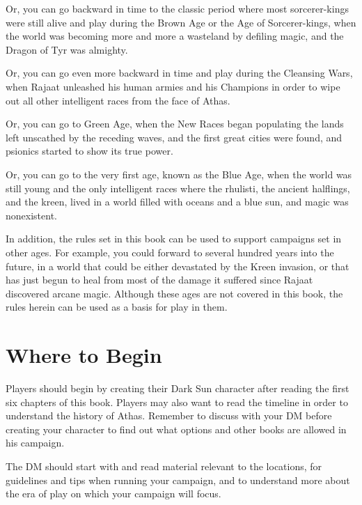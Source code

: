 Or, you can go backward in time to the classic period where most sorcerer-kings were still alive and play during the Brown Age or the Age of Sorcerer-kings, when the world was becoming more and more a wasteland by defiling magic, and the Dragon of Tyr was almighty.

Or, you can go even more backward in time and play during the Cleansing Wars, when Rajaat unleashed his human armies and his Champions in order to wipe out all other intelligent races from the face of Athas.

Or, you can go to Green Age, when the New Races began populating the lands left unscathed by the receding waves, and the first great cities were found, and psionics started to show its true power.

Or, you can go to the very first age, known as the Blue Age, when the world was still young and the only intelligent races where the rhulisti, the ancient halflings, and the kreen, lived in a world filled with oceans and a blue sun, and magic was nonexistent.

In addition, the rules set in this book can be used to support campaigns set in other ages. For example, you could forward to several hundred years into the future, in a world that could be either devastated by the Kreen invasion, or that has just begun to heal from most of the damage it suffered since Rajaat discovered arcane magic. Although these ages are not covered in this book, the rules herein can be used as a basis for play in them.

\section{Where to Begin}

Players should begin by creating their {\tableheader Dark Sun} character after reading the first six chapters of this book. Players may also want to read the timeline in order to understand the history of Athas. Remember to discuss with your DM before creating your character to find out what options and other books are allowed in his campaign.

The DM should start with  and read material relevant to the locations,  for guidelines and tips when running your campaign, and  to understand more about the era of play on which your campaign will focus.

